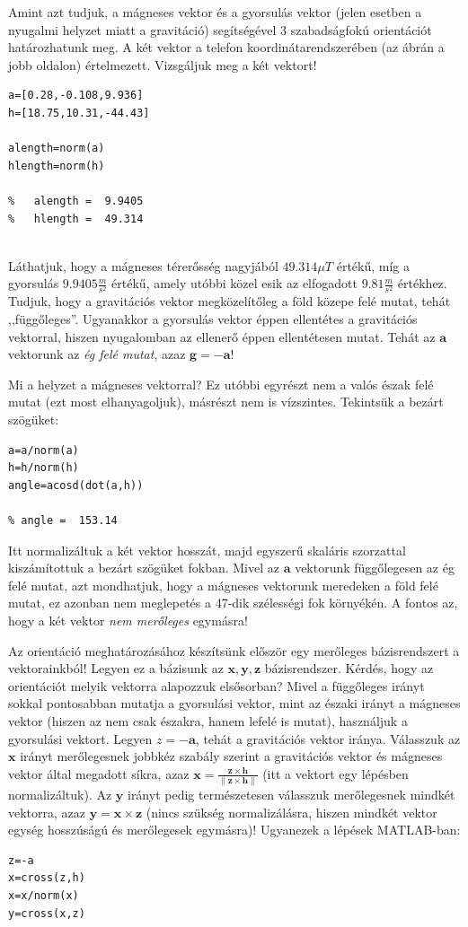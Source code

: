 \begin{answer}
	Amint azt tudjuk, a mágneses vektor és a gyorsulás vektor (jelen esetben a nyugalmi helyzet miatt a gravitáció) segítségével 3 szabadságfokú orientációt határozhatunk meg. A két vektor a telefon koordinátarendszerében (az ábrán a jobb oldalon) értelmezett. Vizsgáljuk meg a két vektort!
	\begin{lstlisting}
a=[0.28,-0.108,9.936]
h=[18.75,10.31,-44.43]
	
alength=norm(a)
hlength=norm(h)
	
%	alength =  9.9405
%	hlength =  49.314
	
	\end{lstlisting}
	Láthatjuk, hogy a mágneses térerősség nagyjából $49.314\mu T$ értékű, míg a gyorsulás $9.9405\frac{m}{s^2}$ értékű, amely utóbbi közel esik az elfogadott $9.81\frac{m}{s^2}$ értékhez. Tudjuk, hogy a gravitációs vektor megközelítőleg a föld közepe felé mutat, tehát ,,függőleges''. Ugyanakkor a gyorsulás vektor éppen ellentétes a gravitációs vektorral, hiszen nyugalomban az ellenerő éppen ellentétesen mutat. Tehát az $\mathbf{a}$ vektorunk az \emph{ég felé mutat}, azaz $\mathbf{g}=-\mathbf{a}$!
	
	Mi a helyzet a mágneses vektorral? Ez utóbbi egyrészt nem a valós észak felé mutat (ezt most elhanyagoljuk), másrészt nem is vízszintes. Tekintsük a bezárt szögüket:
	\begin{lstlisting}
a=a/norm(a)
h=h/norm(h)
angle=acosd(dot(a,h))

% angle =  153.14
	\end{lstlisting}
	Itt normalizáltuk a két vektor hosszát, majd egyszerű skaláris szorzattal kiszámítottuk a bezárt szögüket fokban. Mivel az $\mathbf{a}$ vektorunk függőlegesen az ég felé mutat, azt mondhatjuk, hogy a mágneses vektorunk meredeken a föld felé mutat, ez azonban nem meglepetés a 47-dik szélességi fok környékén. A fontos az, hogy a két vektor \emph{nem merőleges} egymásra!
	
	Az orientáció meghatározásához készítsünk először egy merőleges bázisrendszert a vektorainkból! Legyen ez a bázisunk az $\mathbf{x},\mathbf{y},\mathbf{z}$ bázisrendszer. Kérdés, hogy az orientációt melyik vektorra alapozzuk elsősorban? Mivel a függőleges irányt sokkal pontosabban mutatja a gyorsulási vektor, mint az északi irányt a mágneses vektor (hiszen az nem csak északra, hanem lefelé is mutat), használjuk a gyorsulási vektort. Legyen $z=-\mathbf{a}$, tehát a gravitációs vektor iránya. Válasszuk az $\mathbf{x}$ irányt merőlegesnek jobbkéz szabály szerint a gravitációs vektor és mágneses vektor által megadott síkra, azaz $\mathbf{x}=\frac{\mathbf{z}\times\mathbf{h}}{\|\mathbf{z}\times\mathbf{h}\|}$ (itt a vektort egy lépésben normalizáltuk). Az $\mathbf{y}$ irányt pedig természetesen válasszuk merőlegesnek mindkét vektorra, azaz $\mathbf{y}=\mathbf{x}\times\mathbf{z}$ (nincs szükség normalizálásra, hiszen mindkét vektor egység hosszúságú és merőlegesek egymásra)! Ugyanezek a lépések MATLAB-ban:
	\begin{lstlisting}
z=-a
x=cross(z,h)
x=x/norm(x)
y=cross(x,z)
	\end{lstlisting}
	

\end{answer}
